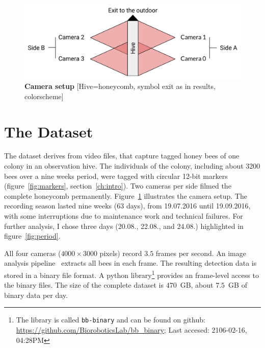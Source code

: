 \begin{figure}[htb]
	\centering
	\includegraphics[width=1\textwidth]{Figures/setupCams}
	\caption[Camera setup]{\textbf{Camera setup} [Hive=honeycomb, symbol exit as in results, colorscheme]}
	\label{fig:cams}
\end{figure}

\section{The Dataset}
\label{sec:dataset}

The dataset derives from video files, that capture tagged honey bees of one colony in an observation hive.
The individuals of the colony, including about 3200 bees over a nine weeks period, were tagged with circular 12-bit markers (figure~\ref{fig:markers}, section~\ref{ch:intro}).
Two cameras per side filmed the complete honeycomb permanently. Figure~\ref{fig:cams} illustrates the camera setup.
The recording season lasted nine weeks (63 days), from 19.07.2016 until 19.09.2016, with some interruptions due to maintenance work and technical failures.
For further analysis, I chose three days (20.08., 22.08., and 24.08.) highlighted in figure~\ref{fig:period}.

All four cameras ($4000\times3000$ pixels) record $3.5$ frames per second. 
An image analysis pipeline~\cite{wario2015automatic} extracts all bees in each frame.
The resulting detection data is stored in a binary file format.
A python library\footnote{The library is called \texttt{bb-binary} and can be found on github: \url{https://github.com/BioroboticsLab/bb_binary}; Last accesed: 2106-02-16, 04:28PM} provides an frame-level access to the binary files.
The size of the complete dataset is $470$~GB, about $7.5$~GB of binary data per day.

